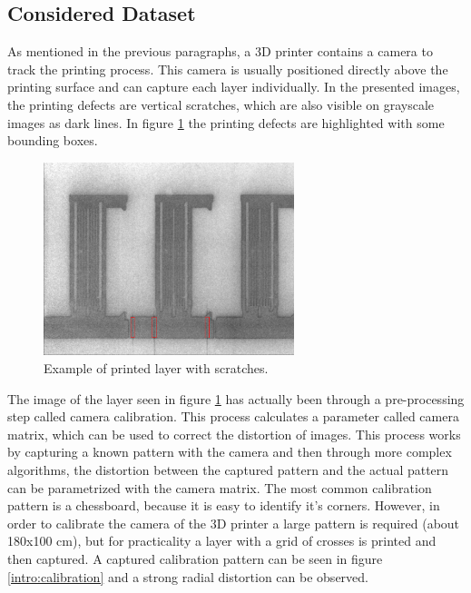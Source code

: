 \subsection{Considered Dataset}
As mentioned in the previous paragraphs, a 3D printer contains a camera to track the printing process. This camera is usually positioned directly above the printing surface and can capture each layer individually. In the presented images, the printing defects are vertical scratches, which are also visible on grayscale images as dark lines. In figure \ref{fig:layer_00325_marked_cropped} the printing defects are highlighted with some bounding boxes. \\

\begin{figure}[!h]
  \includegraphics[width=0.65\textwidth]{images/layer_00325_marked_cropped}
  \centering
  \caption{Example of printed layer with scratches.}
  \label{fig:layer_00325_marked_cropped}
\end{figure}

The image of the layer seen in figure \ref{fig:layer_00325_marked_cropped} has actually been through a pre-processing step called camera calibration. This process calculates a parameter called camera matrix, which can be used to correct the distortion of images. This process works by capturing a known pattern with the camera and then through more complex algorithms, the distortion between the captured pattern and the actual pattern can be parametrized with the camera matrix. The most common calibration pattern is a chessboard, because it is easy to identify it's corners. However, in order to calibrate the camera of the 3D printer a large pattern is required (about 180x100 cm), but for practicality a layer with a grid of crosses is printed and then captured. A captured calibration pattern can be seen in figure \ref{intro:calibration} and a strong radial distortion can be observed. \\

